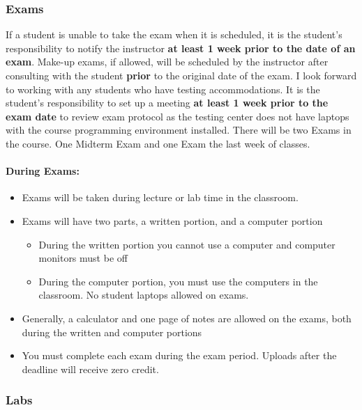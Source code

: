\documentclass[11pt]{article}
\providecommand{\tightlist}{%
      \setlength{\itemsep}{0pt}\setlength{\parskip}{0pt}}
\begin{document}
    \hypertarget{exams}{%
\subsubsection{Exams}\label{exams}}

If a student is unable to take the exam when it is scheduled, it is the
student's responsibility to notify the instructor \textbf{at least 1
week prior to the date of an exam}. Make-up exams, if allowed, will be
scheduled by the instructor after consulting with the student
\textbf{prior} to the original date of the exam. I look forward to
working with any students who have testing accommodations. It is the
student's responsibility to set up a meeting \textbf{at least 1 week
prior to the exam date} to review exam protocol as the testing center
does not have laptops with the course programming environment installed.
There will be two Exams in the course. One Midterm Exam and one Exam the
last week of classes.

\hypertarget{during-exams}{%
\paragraph{During Exams:}\label{during-exams}}

\begin{itemize}
\tightlist
\item
  Exams will be taken during lecture or lab time in the classroom.
\item
  Exams will have two parts, a written portion, and a computer portion

  \begin{itemize}
  \tightlist
  \item
    During the written portion you cannot use a computer and computer
    monitors must be off
  \item
    During the computer portion, you must use the computers in the
    classroom. No student laptops allowed on exams.
  \end{itemize}
\item
  Generally, a calculator and one page of notes are allowed on the
  exams, both during the written and computer portions
\item
  You must complete each exam during the exam period. Uploads after the
  deadline will receive zero credit.
\end{itemize}

    \hypertarget{labs}{%
\subsubsection{Labs}\label{labs}}
\end{document}
